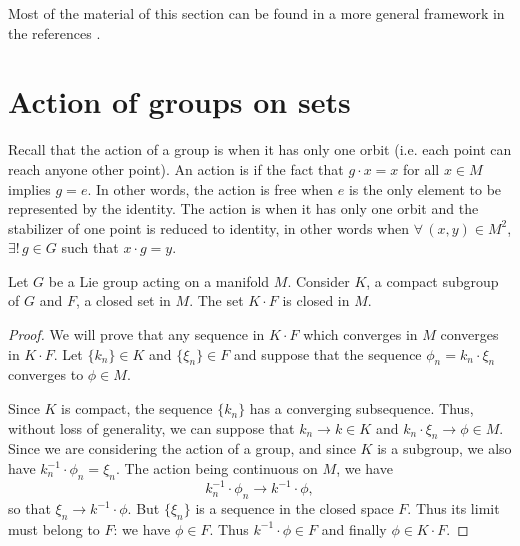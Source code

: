
Most of the material of this section can be found in a more general framework in the references \cite{Helgason, Loos, kobayashi, kobayashi2}.

\section{Action of groups on sets}

Recall that the action of a group is  when it has only one orbit (i.e. each point can reach anyone other point). An action is   if the fact that $g\cdot x=x$ for all $x\in M$ implies $g=e$. In other words, the action is free when $e$ is the only element to be represented by the identity. The action is  when it has only one orbit and the stabilizer of one point is reduced to identity, in other words when $\forall\,(x,y)\in M^{2}$, $\exists!\,g\in G$ such that $x\cdot g=y$.

\begin{lemma}		\label{LemCompactSurFermeFerme}
	Let $G$ be a Lie group acting on a manifold $M$. Consider $K$, a compact subgroup of $G$ and $F$, a closed set in $M$. The set $K\cdot F$ is closed in $M$.
\end{lemma}

\begin{proof}
	We will prove that any sequence in $K\cdot F$ which converges in $M$ converges in $K\cdot F$. Let $\{ k_n\}\in K$ and $\{ \xi_n\}\in F$ and suppose that the sequence $\phi_n=k_n\cdot \xi_n$ converges to $\phi\in M$.

	Since $K$ is compact, the sequence $\{ k_n \}$ has a converging subsequence. Thus, without loss of generality, we can suppose that $k_n\to k\in K$ and $k_n\cdot \xi_n\to\phi\in M$. Since we are considering the action of a group, and since $K$ is a subgroup, we also have $k^{-1}_n\cdot \phi_n=\xi_n$. The action being continuous on $M$, we have
	\begin{equation}
		k_n^{-1}\cdot \phi_n\to k^{-1}\cdot \phi,
	\end{equation}
	so that $\xi_n\to k^{-1}\cdot\phi$. But $\{ \xi_n \}$ is a sequence in the closed space $F$. Thus its limit must belong to $F$: we have $\phi\in F$. Thus $k^{-1}\cdot\phi\in F$ and finally $\phi\in K\cdot F$.
\end{proof}

